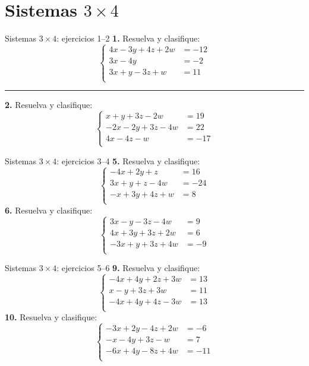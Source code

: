 \documentclass[aspectratio=169,9pt]{beamer}
\theoremstyle{remark}
\begin{document}
\section{Sistemas $3\times 4$}
\begin{frame}{Sistemas $3\times 4$: ejercicios 1--2}
\small
\textbf{1.} Resuelva y clasifique:
\[\left\{\begin{aligned}
4x-3y+4z+2w&=-12\\
3x-4y&=-2\\
3x+y-3z+w&=11\\
\end{aligned}\right.\]
\vspace{0.2em}\hrule\vspace{0.3em}
\textbf{2.} Resuelva y clasifique:
\[\left\{\begin{aligned}
x+y+3z-2w&=19\\
-2x-2y+3z-4w&=22\\
4x-4z-w&=-17\\
\end{aligned}\right.\]
\end{frame}
\begin{frame}{Sistemas $3\times 4$: ejercicios 3--4}
\small
\textbf{5.} Resuelva y clasifique:
\[\left\{\begin{aligned}
-4x+2y+z&=16\\
3x+y+z-4w&=-24\\
-x+3y+4z+w&=8\\
\end{aligned}\right.\]
\textbf{6.} Resuelva y clasifique:
\[\left\{\begin{aligned}
3x-y-3z-4w&=9\\
4x+3y+3z+2w&=6\\
-3x+y+3z+4w&=-9\\
\end{aligned}\right.\]
\end{frame}
\begin{frame}{Sistemas $3\times 4$: ejercicios 5--6}
\small
\textbf{9.} Resuelva y clasifique:
\[\left\{\begin{aligned}
-4x+4y+2z+3w&=13\\
x-y+3z+3w&=11\\
-4x+4y+4z-3w&=13\\
\end{aligned}\right.\]
\textbf{10.} Resuelva y clasifique:
\[\left\{\begin{aligned}
-3x+2y-4z+2w&=-6\\
-x-4y+3z-w&=7\\
-6x+4y-8z+4w&=-11\\
\end{aligned}\right.\]
\end{frame}
\end{document}

